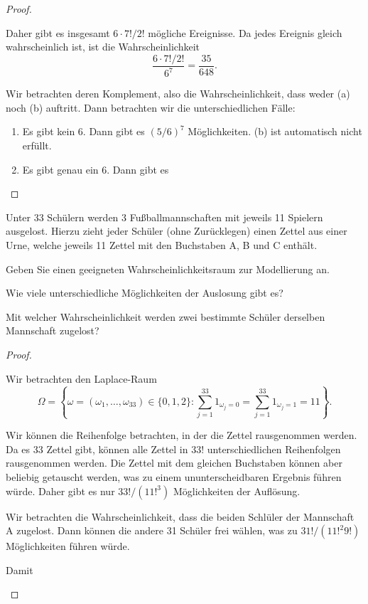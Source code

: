 \begin{proof}
\begin{parts}
	Daher gibt es insgesamt $6\cdot 7! / 2!$ mögliche Ereignisse. Da jedes Ereignis gleich wahrscheinlich ist, ist die Wahrscheinlichkeit
	 \[
	\frac{6\cdot 7! / 2!}{6^7}=\frac{35}{648}
	.\] 
\item Wir betrachten deren Komplement, also die Wahrscheinlichkeit, dass weder (a) noch (b) auftritt. Dann betrachten wir die unterschiedlichen Fälle:
	\begin{enumerate}[label=(\arabic*)]
	\item Es gibt kein $6$. Dann gibt es $(5 / 6)^7$ Möglichkeiten. (b) ist automatisch nicht erfüllt.
	\item Es gibt genau ein $6$. Dann gibt es 
	\end{enumerate}
	\end{parts}
\end{proof}

\begin{Problem}
Unter 33 Schülern werden 3 Fußballmannschaften mit jeweils 11 Spielern ausgelost. Hierzu zieht jeder Schüler (ohne Zurücklegen) einen Zettel aus einer Urne, welche jeweils 11 Zettel mit den Buchstaben A, B und C enthält.	
\begin{parts}
\item Geben Sie einen geeigneten Wahrscheinlichkeitsraum zur Modellierung an.
\item Wie viele unterschiedliche Möglichkeiten der Auslosung gibt es?
\item Mit welcher Wahrscheinlichkeit werden zwei bestimmte Schüler derselben Mannschaft zugelost?
\end{parts}
\end{Problem}
\begin{proof}
	\begin{parts}
	\item Wir betrachten den Laplace-Raum
		\[
		\Omega=\left\{ \omega=(\omega_1, \dots, \omega_{33})\in \{0,1,2\}:\sum_{j=1}^{33}1_{\omega_j=0}=\sum_{j=1}^{33}1_{\omega_j=1}=11 \right\}  
		.\] 
	\item Wir können die Reihenfolge betrachten, in der die Zettel rausgenommen werden. Da es 33 Zettel gibt, können alle Zettel in $33!$ unterschiedlichen Reihenfolgen rausgenommen werden. Die Zettel mit dem gleichen Buchstaben können aber beliebig getauscht werden, was zu einem ununterscheidbaren Ergebnis führen würde. Daher gibt es nur $33! / (11!^3)$ Möglichkeiten der Auflösung.
	\item Wir betrachten die Wahrscheinlichkeit, dass die beiden Schlüler der Mannschaft A zugelost. Dann können die andere 31 Schüler frei wählen, was zu $31! / (11!^2 9!)$ Möglichkeiten führen würde.

		Damit 
	\end{parts}
\end{proof}
